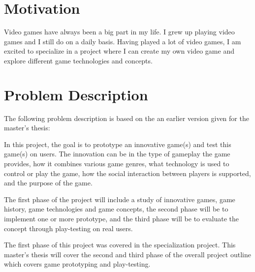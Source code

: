 \section{Motivation}
Video games have always been a big part in my life. I grew up playing video games and I still do on a daily basis. Having played a lot of video games, I am excited to specialize in a project where I can create my own video game and explore different game technologies and concepts.



\section{Problem Description}
The following problem description is based on the an earlier version given for the master's thesis:

\begin{displayquote}
	In this project, the goal is to prototype an innovative game(s) and test this game(s) on users. The innovation can be in the type of gameplay the game provides, how it combines various game genres, what technology is used to control or play the game, how the social interaction between players is supported, and the purpose of the game.
	
	The first phase of the project will include a study of innovative games, game history, game technologies and game concepts, the second phase will be to implement one or more prototype, and the third phase will be to evaluate the concept through play-testing on real users.
\end{displayquote}

The first phase of this project was covered in the specialization project. This master's thesis will cover the second and third phase of the overall project outline which covers game prototyping and play-testing.

